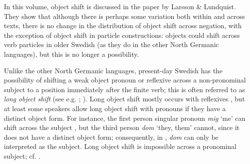 \documentclass[output=paper]{langscibook}
\begin{document}
In this volume, object shift is discussed in the paper by Larsson \& Lundquist. They show that although there is perhaps some variation both within and across texts, there is no change in the distribution of object shift across negation, with the exception of object shift in particle constructions: objects could shift across verb particles in older Swedish (as they do in the other North Germanic languages), but this is no longer a possibility.  



Unlike the other North Germanic languages, present-day Swedish has the possibility of shifting a weak object pronoun or reflexive across a non-pronominal subject to a position immediately after the finite verb; this is often referred to as \textit{long object shift} (see e.g. \citealt{Holmberg1986}; \citealt{Heinat2010}). Long object shift mostly occurs with reflexives , but at least some speakers allow long object shift with pronouns if they have a distinct object form. For instance, the first person singular pronoun \textit{mig} ‘me’ can shift across the subject , but the third person \textit{dom} ‘they, them’ cannot, since it does not have a distinct object form; consequently, in , \textit{dom} can only be interpreted as the subject. Long object shift is impossible across a pronominal subject; cf. .


\ea \label{ex:intro:20}



\end{document}

